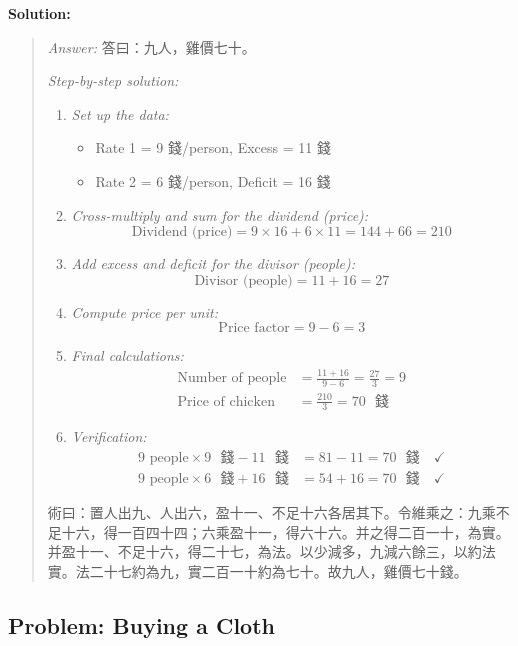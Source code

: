 \documentclass[11pt,a4paper]{article}
\newcommand{\zh}[1]{{#1}}
\newenvironment{chsolution}{%
  \par\medskip\noindent\textbf{\textcolor{notecolor}{Solution:}}\par\nopagebreak
  \begin{quote}\small
}{%
  \end{quote}\medskip
}
\newenvironment{stepbystep}{%
  \par\smallskip\noindent\textit{Step-by-step solution:}\par\nopagebreak
  \begin{enumerate}[leftmargin=2em,label=\textbf{Step \arabic*:},ref=\arabic*]
}{%
  \end{enumerate}\medskip
}
\begin{document}
\begin{chsolution}
\textit{Answer:} \zh{答曰：九人，雞價七十。}

\begin{stepbystep}
\item \textit{Set up the data:}
\begin{itemize}
\item Rate 1 = 9 \zh{錢}/person, Excess = 11 \zh{錢}
\item Rate 2 = 6 \zh{錢}/person, Deficit = 16 \zh{錢}
\end{itemize}

\item \textit{Cross-multiply and sum for the dividend (price):}
\[
\text{Dividend (price)} = 9 \times 16 + 6 \times 11 = 144 + 66 = 210
\]

\item \textit{Add excess and deficit for the divisor (people):}
\[
\text{Divisor (people)} = 11 + 16 = 27
\]

\item \textit{Compute price per unit:}
\[
\text{Price factor} = 9 - 6 = 3
\]

\item \textit{Final calculations:}
\begin{align*}
\text{Number of people} &= \frac{11 + 16}{9 - 6} = \frac{27}{3} = 9 \\
\text{Price of chicken} &= \frac{210}{3} = 70 \text{ \zh{錢}}
\end{align*}

\item \textit{Verification:}
\begin{align*}
9 \text{ people} \times 9 \text{ \zh{錢}} - 11 \text{ \zh{錢}} &= 81 - 11 = 70 \text{ \zh{錢}} \quad \checkmark \\
9 \text{ people} \times 6 \text{ \zh{錢}} + 16 \text{ \zh{錢}} &= 54 + 16 = 70 \text{ \zh{錢}} \quad \checkmark
\end{align*}
\end{stepbystep}

\zh{術曰：置人出九、人出六，盈十一、不足十六各居其下。令維乘之：九乘不足十六，得一百四十四；六乘盈十一，得六十六。并之得二百一十，為實。并盈十一、不足十六，得二十七，為法。以少減多，九減六餘三，以約法實。法二十七約為九，實二百一十約為七十。故九人，雞價七十錢。}
\end{chsolution}

\subsection{Problem: Buying a Cloth}
\end{document}
